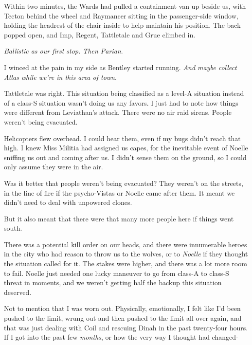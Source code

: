 Within two minutes, the Wards had pulled a containment van up beside us, with Tecton behind the wheel and Raymancer sitting in the passenger-side window, holding the headrest of the chair inside to help maintain his position.  The back popped open, and Imp, Regent, Tattletale and Grue climbed in.



\emph{Ballistic as our first stop.  Then Parian}.



I winced at the pain in my side as Bentley started running.  \emph{And maybe collect Atlas while we're in this area of town}.



Tattletale was right.  This situation being classified as a level-A situation instead of a class-S situation wasn't doing us any favors.  I just had to note how things were different from Leviathan's attack.  There were no air raid sirens.  People weren't being evacuated.



Helicopters flew overhead.  I could hear them, even if my bugs didn't reach that high.  I knew Miss Militia had assigned us capes, for the inevitable event of Noelle sniffing us out and coming after us.  I didn't sense them on the ground, so I could only assume they were in the air.



Was it better that people weren't being evacuated?  They weren't on the streets, in the line of fire if the psycho-Vistas or Noelle came after them.  It meant we didn't need to deal with unpowered clones.



But it also meant that there were that many more people here if things went south.



There was a potential kill order on our heads, and there were innumerable heroes in the city who had reason to throw us to the wolves, or to \emph{Noelle }if they thought the situation called for it.  The stakes were higher, and there was a lot more room to fail.  Noelle just needed one lucky maneuver to go from class-A to class-S threat in moments, and we weren't getting half the backup this situation deserved.



Not to mention that I was worn out.  Physically, emotionally, I felt like I'd been pushed to the limit, wrung out and then pushed to the limit all over again, and that was just dealing with Coil and rescuing Dinah in the past twenty-four hours.  If I got into the past few \emph{months}, or how the very way I thought had changed-



